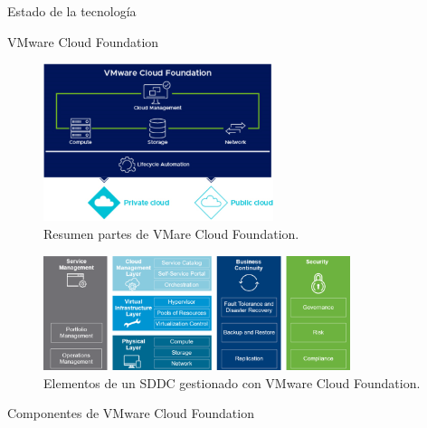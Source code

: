 \begin{section}{Estado de la tecnología}
\begin{subsection}{VMware Cloud Foundation}
\begin{itemize}
\end{itemize}
\begin{figure}[h!]
    \centering
    \includegraphics[width=0.6\textwidth]{imaxes/cap2recursos/overviewCF.png}
            \caption{Resumen partes de VMare Cloud Foundation.}
    \label{fig:Cloud-Foundation-Overview}
    \end{figure}
    \FloatBarrier
    \begin{figure}[h]
        \centering
        \includegraphics[width=0.8\textwidth]{imaxes/cap2recursos/SDDCoverview.png}
        \caption{Elementos de un SDDC gestionado con VMware Cloud Foundation.}
        \label{fig:layers-Sddc}
    \end{figure}
    \FloatBarrier
\end{subsection}

\begin{subsection}{Componentes de VMware Cloud Foundation}
\label{subsubsect:cfcomponents}


\end{subsection}
\end{section}
